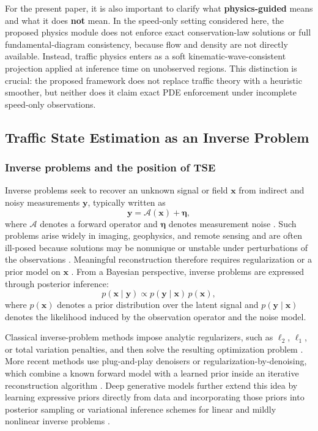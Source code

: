 \documentclass[a4paper,fleqn]{cas-sc}
\numberwithin{equation}{section}
\begin{document}
For the present paper, it is also important to clarify what \textbf{physics-guided} means and what it does \textbf{not} mean. In the speed-only setting considered here, the proposed physics module does not enforce exact conservation-law solutions or full fundamental-diagram consistency, because flow and density are not directly available. Instead, traffic physics enters as a soft kinematic-wave-consistent projection applied at inference time on unobserved regions. This distinction is crucial: the proposed framework does not replace traffic theory with a heuristic smoother, but neither does it claim exact PDE enforcement under incomplete speed-only observations.

\subsection{Traffic State Estimation as an Inverse Problem}

\subsubsection{Inverse problems and the position of TSE}

Inverse problems seek to recover an unknown signal or field $\mathbf{x}$ from indirect and noisy measurements $\mathbf{y}$, typically written as
\[
\mathbf{y} = \mathcal{A}(\mathbf{x}) + \boldsymbol{\eta},
\]
where $\mathcal{A}$ denotes a forward operator and $\boldsymbol{\eta}$ denotes measurement noise \citep{tarantola2005inverse, ribes2008linear}. Such problems arise widely in imaging, geophysics, and remote sensing and are often ill-posed because solutions may be nonunique or unstable under perturbations of the observations \citep{barrett2013foundations, donoho2006compressed}. Meaningful reconstruction therefore requires regularization or a prior model on $\mathbf{x}$ \citep{daubechies2004iterative, barrett2013foundations}. From a Bayesian perspective, inverse problems are expressed through posterior inference:
\begin{equation}
    p(\mathbf{x}\mid \mathbf{y}) \propto p(\mathbf{y}\mid \mathbf{x})\,p(\mathbf{x}),
\end{equation}
where $p(\mathbf{x})$ denotes a prior distribution over the latent signal and $p(\mathbf{y}\mid \mathbf{x})$ denotes the likelihood induced by the observation operator and the noise model.

Classical inverse-problem methods impose analytic regularizers, such as $\ell_2$, $\ell_1$, or total variation penalties, and then solve the resulting optimization problem \citep{daubechies2004iterative, donoho2006compressed}. More recent methods use plug-and-play denoisers or regularization-by-denoising, which combine a known forward model with a learned prior inside an iterative reconstruction algorithm \citep{venkatakrishnan2013plug, romano2017little, kamilov2023plug}. Deep generative models further extend this idea by learning expressive priors directly from data and incorporating those priors into posterior sampling or variational inference schemes for linear and mildly nonlinear inverse problems \citep{song2019generative, ho2020denoising, kawar2022denoising, chung2023diffusion}.
\end{document}
